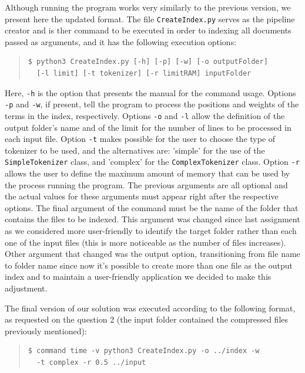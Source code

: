 \documentclass[12pt]{article}
\begin{document}
Although running the program works very similarly to the previous version, we
present here the updated format.
The file \texttt{CreateIndex.py} serves as the pipeline creator and is ther command to be executed in order to 
indexing all documents passed as arguments, and it has the following execution options:

\begingroup
\addtolength\leftmargini{-0.4in}
\addtolength\baselineskip{-0.05in}
\begin{quote}
\begin{verbatim}
$ python3 CreateIndex.py [-h] [-p] [-w] [-o outputFolder] 
  [-l limit] [-t tokenizer] [-r limitRAM] inputFolder
\end{verbatim}
\end{quote}
\endgroup

Here, \texttt{-h} is the option that presents the manual for the command usage.
Options \texttt{-p} and \texttt{-w}, if present, tell the program to process the
positions and weights of the terms in the index, respectively.
Options \texttt{-o} and \texttt{-l} allow the definition of the output folder's 
name and of the limit for the number of lines to be processed in each input file.
Option \texttt{-t} makes possible for the user to choose the type of tokenizer
to be used, and the alternatives are: 'simple' for the use of the 
\texttt{SimpleTokenizer} class, and 'complex' for the \texttt{ComplexTokenizer} class.
Option \texttt{-r} allows the user to define the maximum amount of memory that can
be used by the process running the program.
The previous arguments are all optional and the actual values for these arguments
must appear right after the respective options.
The final argument of the command must be the name of the folder that contains the
files to be indexed. This argument was changed since last assignment as we considered
more user-friendly to identify the target folder rather than each one of the input files
(this is more noticeable as the number of files increases). Other argument that changed
was the output option, transitioning from file name to folder name since now it's possible
to create more than one file as the output index and to maintain a user-friendly application we decided
to make this adjustment.

The final version of our solution was executed according to the following format,
as requested on the question 2 (the input folder contained the compressed
files previously mentioned):

\begingroup
\addtolength\leftmargini{-0.4in}
\addtolength\baselineskip{-0.05in}
\begin{quote}
\begin{verbatim}
$ command time -v python3 CreateIndex.py -o ../index -w 
  -t complex -r 0.5 ../input
\end{verbatim}
\end{quote}
\endgroup
\end{document}
